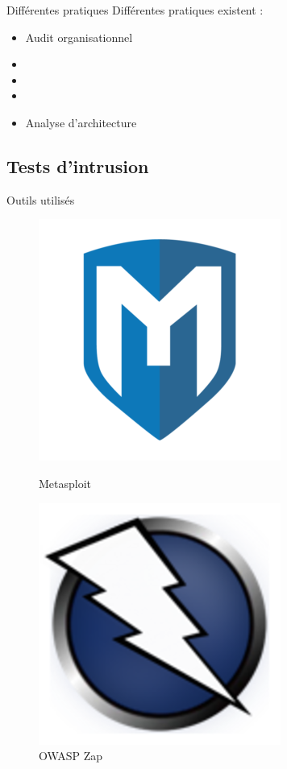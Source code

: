 \documentclass{beamer}
\newcommand{\colorized}[1]{{\color{red}{#1}}}
\begin{document}
		\begin{frame}{Différentes pratiques}
			Différentes pratiques existent : 
			\begin{itemize}
				\item Audit organisationnel
				\item \colorized{Tests d'intrusion (fuzzing)}
				\item \colorized{Revue de code source}
				\item \colorized{Relevés de configuration}
				\item Analyse d'architecture
			\end{itemize}		
		\end{frame}
	
	\subsection{Tests d'intrusion} 
		\begin{frame}{Outils utilisés}
				    \begin{figure}
        \centering
        \begin{minipage}{.5\textwidth}
            \centering
            \includegraphics[width=.4\linewidth]{schemas/images/metasploit.png}
            \caption{Metasploit}
        \end{minipage}%
        \begin{minipage}{.5\textwidth}
            \centering
            \includegraphics[width=.4\linewidth]{schemas/images/zap.png}
            \caption{OWASP Zap}
        \end{minipage}
    \end{figure}	
		\end{frame}
\end{document}

